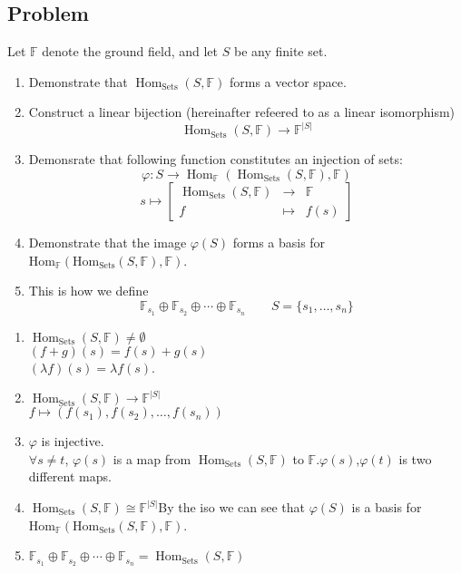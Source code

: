 \documentclass[11pt]{ctexart}
\theoremstyle{definition}
\numberwithin{equation}{section}
\newcommand{\op}[1]{\operatorname{#1}}%
\newcommand{\FF}{\mathbb{F}}%
\theoremstyle{definition}
\theoremstyle{remark}
\begin{document}
\subsection{Problem}
Let $\FF$ denote the ground field, and let $S$ be any finite set.
\begin{enumerate}
    \item Demonstrate that $\op{Hom}_{\op{Sets}}(S,\FF)$ forms a vector space.
    \item Construct a linear bijection (hereinafter refeered to as a linear isomorphism)\[\op{Hom}_{\op{Sets}}(S,\FF)\to \FF^{|S|}\]
    \item Demonsrate that following function constitutes an injection of sets:\[\varphi:S\to \op{Hom}_{\FF}(\op{Hom}_{\op{Sets}}(S,\FF),\FF)\]\[s\mapsto \begin{bmatrix}\op{Hom}_{\op{Sets}}(S,\FF) &\to  &\FF\\ f &\mapsto & f(s)\end{bmatrix}\]
    \item Demonstrate that the image $\varphi(S)$ forms a basis for $\mathrm{Hom}_{\mathbb{F}}(\mathrm{Hom}_{\mathrm{Sets}}(S, \mathbb{F}), \mathbb{F})$.
    \item This is how we define\[\FF_{s_1}\oplus \FF_{s_2}\oplus\cdots\oplus\FF_{s_n}\qquad S=\{s_1,\ldots,s_n\}\]
\end{enumerate}
\begin{aaa}
    \begin{enumerate}
        \item $\op{Hom}_{\op{Sets}}(S,\FF) \neq \emptyset$\\$(f+g)(s)=f(s)+g(s)$\\$(\lambda f)(s)=\lambda f(s)$.
        \item $\op{Hom}_{\op{Sets}}(S,\FF)\to \FF^{|S|}$\\$f\mapsto (f(s_1),f(s_2),\ldots,f(s_n))$
        \item $\varphi$ is injective.\\$\forall s \neq t$, $\varphi(s)$ is a map from $\op{Hom}_{\op{Sets}}(S,\FF)$ to $\FF$.$\varphi(s)$,$\varphi(t)$ is two different maps.
        \item $\op{Hom}_{\op{Sets}}(S,\FF)\cong  \FF^{|S|}$By the iso we can see that $\varphi(S)$ is a basis for $\mathrm{Hom}_{\mathbb{F}}(\mathrm{Hom}_{\mathrm{Sets}}(S, \mathbb{F}), \mathbb{F})$.
        \item $\FF_{s_1}\oplus \FF_{s_2}\oplus\cdots\oplus\FF_{s_n}=\op{Hom}_{\op{Sets}}(S,\FF)$
    \end{enumerate}
\end{aaa}
\end{document}
